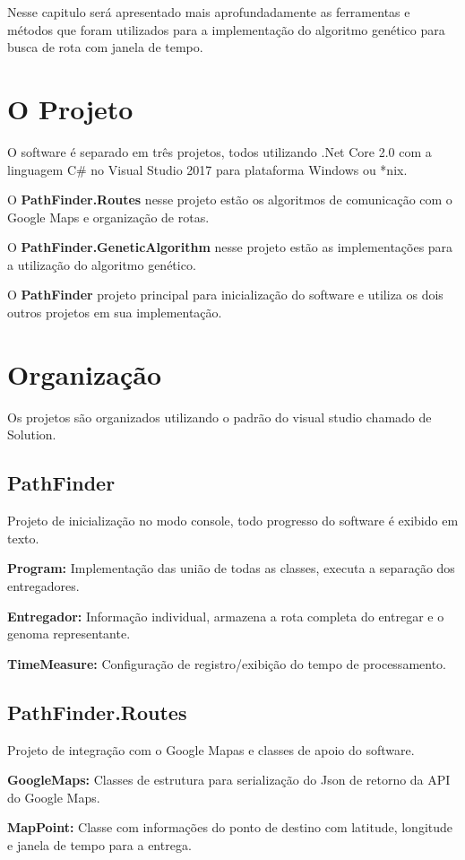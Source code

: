 Nesse capitulo será apresentado mais aprofundadamente as ferramentas e métodos que foram utilizados para a implementação do algoritmo genético para busca de rota com janela de tempo.
 
\section{O Projeto}
O software é separado em três projetos, todos utilizando .Net Core 2.0 com a linguagem C\# no Visual Studio 2017 para plataforma Windows ou \**nix.

O \textbf{PathFinder.Routes} nesse projeto estão os algoritmos de comunicação com o Google Maps e organização de rotas.

O \textbf{PathFinder.GeneticAlgorithm} nesse projeto estão as implementações para a utilização do algoritmo genético.

O \textbf{PathFinder} projeto principal para inicialização do software e utiliza os dois outros projetos em sua implementação.

\section{Organização}
Os projetos são organizados utilizando o padrão do visual studio chamado de Solution.

\subsection{PathFinder}
Projeto de inicialização no modo console, todo progresso do software é exibido em texto.

\textbf{Program:} Implementação das união de todas as classes, executa a separação dos entregadores.

\textbf{Entregador:} Informação individual, armazena a rota completa do entregar e o genoma representante.

\textbf{TimeMeasure:} Configuração de registro/exibição do tempo de processamento.
\subsection{PathFinder.Routes}

Projeto de integração com o Google Mapas e classes de apoio do software.

\textbf{GoogleMaps:} Classes de estrutura para serialização do Json de retorno da API do Google Maps.

\textbf{MapPoint:} Classe com informações do ponto de destino com latitude, longitude e janela de tempo para a entrega.

